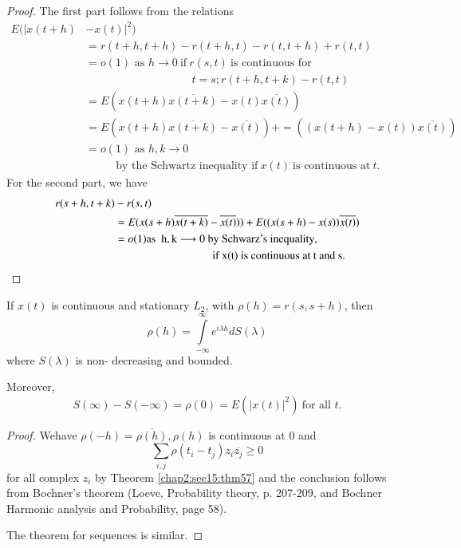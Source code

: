 \begin{proof}
  The first part follows from the relations
  \begin{align*}
    E (|x(t+h) & -x(t)|^2)\\ 
    &= r(t+h,t+h)-r(t+h,t)-r(t,t+h)+r(t,t)\\
    & =o(1) \text{ as } h\longrightarrow 0 ~\text{if}~ r(s,t)~\text{
      is continuous for}\\ 
    & \hspace{4cm}{t=s; r(t+h,t+k)-r(t,t)}\\
    & =E(x(t+h) \overline{x(t+k)}-x(t)\overline{x(t)})\\
    & =E(x(t+h)
    \overline{x(t+k)}-\overline{x(t)})+=((x(t+h)-x(t))\overline{x(t)})\\ 
    & =o(1) \text{ as } h,k\longrightarrow 0\\ 
    & \hspace{1cm}\text{ by the Schwartz inequality if} ~x(t) ~\text{is
      continuous at}~ t. 
  \end{align*}
  For the second part, we have
  \begin{align*}
    r(s+h, t+k)& -r(s,t)\\
    &=E(x(s+h)
    \overline{x(t+k)}-\overline{x(t)}))+E((x(s+h)-x(s))\overline{x(t)})\\
    &=o(1)\rm as~~ h,k\longrightarrow 0\text { by Schwarz's inequality},\\
    &\hspace{3cm} \text { if x(t)  is continuous at t  and s.}
  \end{align*}
\end{proof}

\begin{theorem}\label{chap2:sec15:thm61} %
   If $x(t)$ is continuous and stationary $L_2$, with 
   $\rho(h)=r(s,s+h)$, then
   $$
   \rho(h)= \int\limits^{\infty}_{-\infty} e^{i \lambda h} dS
   (\lambda)
   $$
   where $S(\lambda)$ is non- decreasing and bounded.
   
   Moreover,
   $$
   S(\infty)-S(-\infty)= \rho(0)=E(|x(t)|^2) ~\text {for all }t.
   $$
\end{theorem}
 
\begin{proof}
  We\pageoriginale have ${\rho(-h)= \overline{\rho(h)},\rho(h)}$ is continuous at 0 and  
  $$ 
  \sum\limits_{i,j} \rho (t_i-t_j) z_i \overline{z_j} \geq 0
  $$
  for all complex ${z_i}$ by Theorem \ref{chap2:sec15:thm57} and the conclusion follows from
  Bochner's theorem (Loeve, Probability theory, p.  
  207-209, and Bochner Harmonic analysis  and Probability, page 58).
  
  The theorem for sequences is similar. 
\end{proof}

